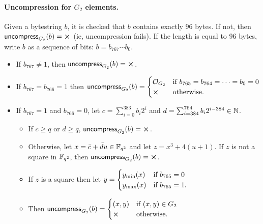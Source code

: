 \paragraph{Uncompression for $G_2$ elements.}  Given a bytestring $b$, it is checked that
$b$ contains exactly 96 bytes.  If not, then $\uncompress_{G_2}(b) = \errorX$ (ie,
uncompression fails).  If the length is equal to 96 bytes, write $b$ as a
sequence of bits: $b = b_{767} \cdots b_0$.
\begin{itemize}
\item If $b_{767} \neq 1$, then $\uncompress_{G_2}(b) = \errorX$.
\item If $b_{767} = b_{766} = 1$ then $\uncompress_{G_2}(b) =
\begin{cases}
\mathcal{O}_{G_2} & \text{if $b_{765} = b_{764} = \cdots = b_0 = 0$}\\
\errorX & \text{otherwise}.
\end{cases}$
\item If $b_{767}=1$ and $b_{766} = 0$, let $c=\sum_{i=0}^{383}b_i2^i$ and $d=\sum_{i=384}^{764}b_i2^{i-384} \in \mathbb{N}$.
\begin{itemize}
\item If $c \geq q$ or $d \geq q$, $\uncompress_{G_2}(b) = \errorX$.
\item Otherwise, let $x = \bar{c}+\bar{d}u \in \mathbb{F}_{q^2}$ and let $z = x^3+4(u+1)$.
If $z$ is not a square in $\mathbb{F}_{q^2}$, then $\uncompress_{G_2}(b) = \errorX$.
\item If $z$ is a square then let
$y=\begin{cases}
y_{\text{min}}(x) & \text{if $b_{765}=0$}\\
y_{\text{max}}(x) & \text{if $b_{765}=1$}.
\end{cases}$
\item Then $\uncompress_{G_2}(b) = \begin{cases}
(x,y) & \text{if $(x,y) \in G_2$}\\
\errorX & \text{otherwise}.
\end{cases}$
\end{itemize}
\end{itemize}


